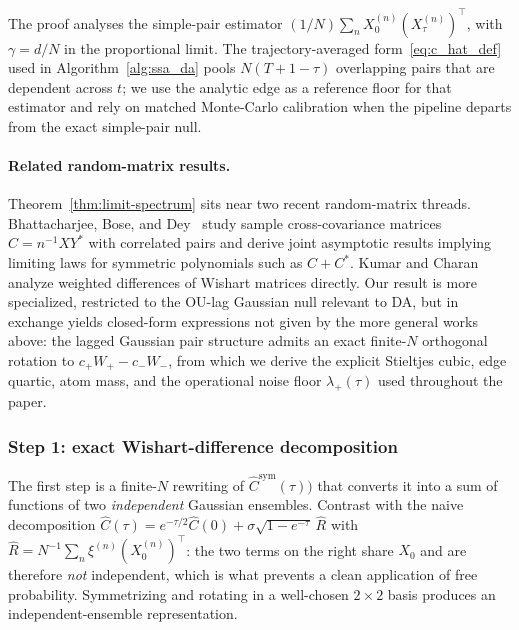 \documentclass{article}
\begin{document}
The proof analyses the simple-pair estimator
$(1/N)\sum_n X_0^{(n)}(X_\tau^{(n)})^\top$, with $\gamma = d/N$ in the
proportional limit. The trajectory-averaged form~\eqref{eq:c_hat_def}
used in Algorithm~\ref{alg:ssa_da} pools $N(T+1-\tau)$ overlapping
pairs that are dependent across $t$; we use the analytic edge as a
reference floor for that estimator and rely on matched Monte-Carlo
calibration when the pipeline departs from the exact simple-pair null.

\paragraph{Related random-matrix results.}
Theorem~\ref{thm:limit-spectrum} sits near two recent random-matrix
threads. Bhattacharjee, Bose, and Dey~\cite{bhattacharjee2023} study
sample cross-covariance matrices $C = n^{-1}XY^\ast$ with correlated
pairs and derive joint asymptotic results implying limiting laws for
symmetric polynomials such as $C + C^\ast$. Kumar and
Charan~\cite{kumar2020differencewishart} analyze weighted differences of
Wishart matrices directly. Our result is more specialized, restricted to the OU-lag Gaussian
null relevant to DA, but in exchange yields closed-form expressions
not given by the more general works above: the lagged Gaussian pair
structure admits an exact finite-$N$ orthogonal rotation to
$c_+W_+ - c_-W_-$, from which we derive the explicit Stieltjes cubic,
edge quartic, atom mass, and the operational noise floor
$\lambda_+(\tau)$ used throughout the paper.





\subsubsection{Step 1: exact Wishart-difference decomposition}
\label{app:wishart-decomp}

The first step is a finite-$N$ rewriting of $\hat C^{\mathrm{sym}}(\tau))$ that converts it
into a sum of functions of two \emph{independent} Gaussian ensembles.
Contrast with the naive decomposition
$\hat C(\tau) = e^{-\tau/2}\hat C(0) + \sigma\sqrt{1-e^{-\tau}}\,\hat R$
with $\hat R = N^{-1}\sum_n \xi^{(n)}(X_0^{(n)})^\top$: the two terms on
the right share $X_0$ and are therefore \emph{not} independent, which
is what prevents a clean application of free probability. Symmetrizing
and rotating in a well-chosen $2{\times}2$ basis produces an
independent-ensemble representation.
\end{document}
